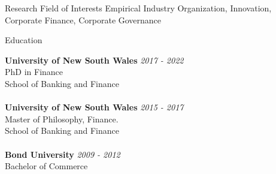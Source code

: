 \documentclass{resume} %
\begin{document}

\begin{rSection}{Research Field of Interests}
	Empirical Industry Organization, Innovation, Corporate Finance, Corporate Governance

\end{rSection}
\begin{rSection}{Education}

	{\bf University of New South Wales} \hfill {\em 2017 - 2022}
	\\ PhD in Finance
	\\ School of Banking and Finance\\
	\\{\bf University of New South Wales} \hfill {\em 2015 - 2017}
	\\ Master of Philosophy, Finance.
	\\ School of Banking and Finance
	\\
	\\{\bf Bond University} \hfill {\em 2009 - 2012}
	\\ Bachelor of Commerce
\end{rSection}
\end{document}
